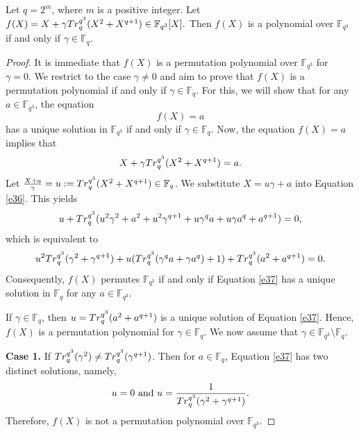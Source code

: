\documentclass[10pt,a4paper]{amsart}
\def\Tr{{\rm Tr}}
\newcommand{\F}{\mathbb F}
\begin{document}
   \begin{thm}\label{T31}
    Let $q=2^m$, where $m$ is a positive integer. Let $f(X)=X+\gamma \Tr_{q}^{q^3}(X^2+X^{q+1}) \in \F_{q^3}[X].$ Then $f(X)$ is a polynomial over $\F_{q^3}$ if and only if $\gamma \in \F_q.$ 
\end{thm}

\begin{proof}
    It is immediate that $f(X)$ is a permutation polynomial over $\F_{q^3}$ for $\gamma=0.$ We restrict to the case $\gamma \neq 0$ and aim to prove that $f(X)$ is a permutation polynomial if and only if $\gamma \in \F_q.$ For this, we will show that  for any $a \in \F_{q^3}$, the equation $$f(X)=a$$  has a unique solution in $\F_{q^3}$ if and only if $\gamma \in \F_q.$ Now, the equation $f(X)=a$ implies that
    \begin{equation}\label{e36}
    X+\gamma\Tr_{q}^{q^3}(X^2+X^{q+1})=a.    
    \end{equation}
    Let $\frac{X+a}{\gamma}=u:=\Tr_{q}^{q^3}(X^2+X^{q+1}) \in \F_q$. We substitute $X=u\gamma+a$ into Equation \eqref{e36}. This yields 
    \begin{equation*}
        u+\Tr_{q}^{q^3}(u^2\gamma^2+a^2+u^2\gamma^{q+1}+u\gamma^qa+u\gamma a^q+a^{q+1})=0,
    \end{equation*}
    which is equivalent to 
    \begin{equation}\label{e37}
        u^2\Tr_{q}^{q^3}(\gamma^2+\gamma^{q+1})+u(\Tr_{q}^{q^3}(\gamma^qa+\gamma a^q)+1)+\Tr_{q}^{q^3}(a^2+a^{q+1})=0.
    \end{equation}
   Consequently, $f(X)$ permutes $\F_{q^3}$ if and only if Equation \eqref{e37} has a unique solution in $\F_q$ for any $a \in \F_{q^3}$. 

If $\gamma \in \F_q$, then $u=\Tr_{q}^{q^3}(a^2+a^{q+1})$ is a unique solution of Equation \eqref{e37}. Hence, $f(X)$ is a permutation polynomial for $\gamma \in \F_q.$ We now assume that $\gamma \in \F_{q^3} \setminus \F_q.$

\textbf{Case 1.} If $\Tr_{q}^{q^3}(\gamma^2) \neq \Tr_{q}^{q^3}(\gamma^{q+1})$. Then for $a \in \F_q$, Equation \eqref{e37} has two distinct solutions, namely, $$u=0 \text{ and }  u=\frac{1}{\Tr_{q}^{q^3}(\gamma^2+\gamma^{q+1})}.$$ Therefore, $f(X)$ is not a permutation polynomial over $\F_{q^3}$.


\end{proof}
\end{document}
